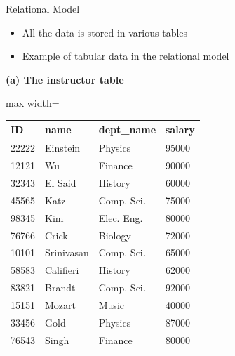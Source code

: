 \documentclass[aspectratio=169, xcolor=dvipsnames]{beamer}
\begin{document}
\begin{frame}{Relational Model}
    \begin{itemize}[<+->]
        \item All the data is stored in various tables
        \item Example of tabular data in the relational model
    \end{itemize}
    
    \vspace{0.5em}
    \begin{center}
        \textbf{(a) The instructor table}
    \end{center}
    \begin{center}
        \begin{adjustbox}{max width=\textwidth}
        \begin{tabular}{|l|l|l|l|}
        \hline
        \textbf{ID} & \textbf{name} & \textbf{dept\_name} & \textbf{salary} \\ \hline
        22222 & Einstein & Physics & 95000 \\ \hline
        12121 & Wu & Finance & 90000 \\ \hline
        32343 & El Said & History & 60000 \\ \hline
        45565 & Katz & Comp. Sci. & 75000 \\ \hline
        98345 & Kim & Elec. Eng. & 80000 \\ \hline
        76766 & Crick & Biology & 72000 \\ \hline
        10101 & Srinivasan & Comp. Sci. & 65000 \\ \hline
        58583 & Califieri & History & 62000 \\ \hline
        83821 & Brandt & Comp. Sci. & 92000 \\ \hline
        15151 & Mozart & Music & 40000 \\ \hline
        33456 & Gold & Physics & 87000 \\ \hline
        76543 & Singh & Finance & 80000 \\ \hline
        \end{tabular}
        \end{adjustbox}
    \end{center}
\end{frame}
\end{document}
